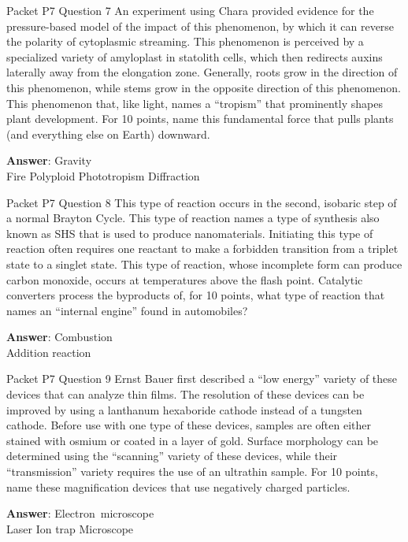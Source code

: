 \begin{frame}{Packet P7 Question 7}
An experiment using Chara provided evidence for the pressure-based model of the impact of this phenomenon, by which it can reverse the polarity of cytoplasmic streaming. This phenomenon is perceived by a specialized variety of amyloplast in statolith cells, which then redirects auxins laterally away from the elongation zone. Generally, roots grow in the direction of this phenomenon, while stems grow in the opposite direction of this phenomenon. This phenomenon that, like light, names a “tropism” that prominently shapes plant development. For 10 points, name this fundamental force that pulls plants (and everything else on Earth) downward.        

\textbf{Answer}: Gravity\\
 Fire
 Polyploid
 Phototropism
 Diffraction
\end{frame}

\begin{frame}{Packet P7 Question 8}
This type of reaction occurs in the second, isobaric step of a normal Brayton Cycle. This type of reaction names a type of synthesis also known as SHS that is used to produce nanomaterials. Initiating this type of reaction often requires one reactant to make a forbidden transition from a triplet state to a singlet state.       This type of reaction, whose incomplete form can produce carbon monoxide, occurs at temperatures above the flash point. Catalytic converters process the byproducts   of, for 10 points, what type of reaction that names an “internal engine” found in automobiles?

\textbf{Answer}: Combustion\\
 Addition reaction
\end{frame}

\begin{frame}{Packet P7 Question 9}
Ernst Bauer first described a “low energy” variety of these devices that can analyze thin films. The resolution of these devices can be improved by using a lanthanum hexaboride cathode instead of a tungsten cathode. Before use with one type of these devices, samples   are often either stained with osmium or coated in a layer of gold. Surface morphology can be determined using the “scanning” variety of these devices, while their “transmission” variety requires the use of an ultrathin sample. For 10 points,   name these magnification devices that use negatively charged particles.    

\textbf{Answer}: Electron\ microscope\\
 Laser
 Ion trap
 Microscope
\end{frame}

